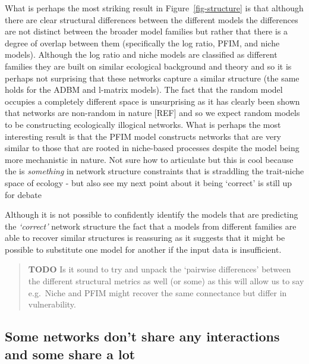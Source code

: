 \documentclass[
]{article}
\begin{document}
What is perhaps the most striking result in Figure~\ref{fig-structure}
is that although there are clear structural differences between the
different models the differences are not distinct between the broader
model families but rather that there is a degree of overlap between them
(specifically the log ratio, PFIM, and niche models). Although the log
ratio and niche models are classified as different families they are
built on similar ecological background and theory and so it is perhaps
not surprising that these networks capture a similar structure (the same
holds for the ADBM and l-matrix models). The fact that the random model
occupies a completely different space is unsurprising as it has clearly
been shown that networks are non-random in nature {[}REF{]} and so we
expect random models to be constructing ecologically illogical networks.
What is perhaps the most interesting result is that the PFIM model
constructs networks that are very similar to those that are rooted in
niche-based processes despite the model being more mechanistic in
nature. Not sure how to articulate but this is cool because the is
\emph{something} in network structure constraints that is straddling the
trait-niche space of ecology - but also see my next point about it being
`correct' is still up for debate

Although it is not possible to confidently identify the models that are
predicting the \emph{`correct'} network structure the fact that a models
from different families are able to recover similar structures is
reassuring as it suggests that it might be possible to substitute one
model for another if the input data is insufficient.

\begin{quote}
\textbf{TODO} Is it sound to try and unpack the `pairwise differences'
between the different structural metrics as well (or some) as this will
allow us to say e.g.~Niche and PFIM might recover the same connectance
but differ in vulnerability.
\end{quote}

\subsection{Some networks don't share any interactions and some share a
lot}\label{some-networks-dont-share-any-interactions-and-some-share-a-lot}
\end{document}
